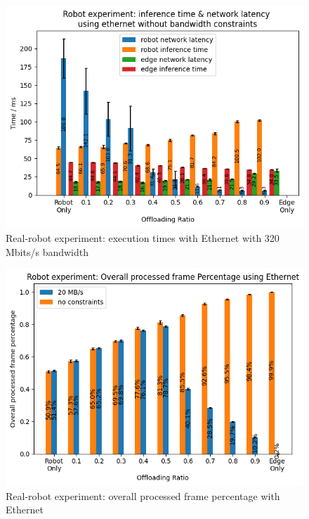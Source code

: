 \begin{figure}
    \centering
    \includegraphics[width=\linewidth]{figures/experiment/real_robot/eth/execution_time_320.png}
    \caption{Real-robot experiment: execution times with Ethernet with 320 Mbits/s bandwidth}
    \label{fig:real_robot_experiment:eth_execution_time_320}
\end{figure}

\begin{figure}
    \centering
    \includegraphics[width=\linewidth]{figures/experiment/real_robot/eth/overall_processed_frame_percentage.png}
    \caption{Real-robot experiment: overall processed frame percentage with Ethernet}
    \label{fig:real_robot_experiment:eth_overall_processed_frame_percentage}
\end{figure}

